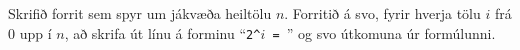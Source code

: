 \begin{problem}
	Skrifið forrit sem spyr um jákvæða heiltölu $n$. Forritið á svo, fyrir hverja tölu $i$ frá $0$ upp í $n$, að skrifa út línu á forminu "`\texttt{2\^{}$i$ = }"' og svo útkomuna úr formúlunni.

\begin{example}
%
\end{example}
\begin{example}
%
\end{example}
\end{problem}